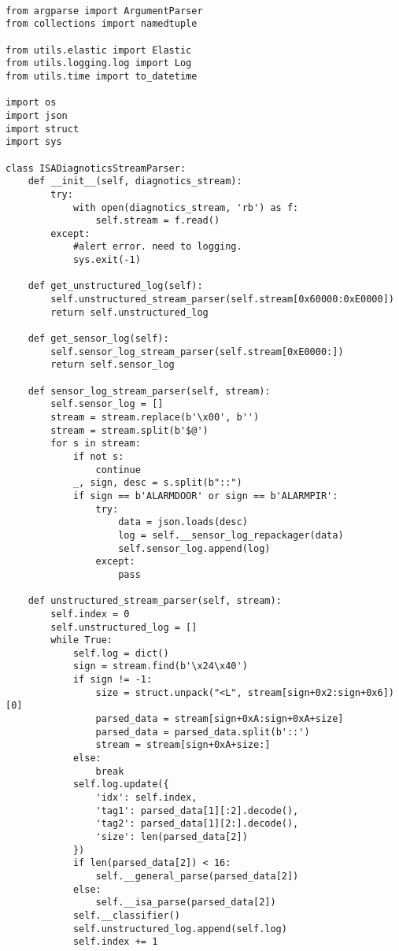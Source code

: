 \documentclass{easychair}
\begin{document}
\lstset{language=Python}
\lstset{frame=lines}
\lstset{basicstyle=\footnotesize}
\begin{lstlisting}

from argparse import ArgumentParser
from collections import namedtuple

from utils.elastic import Elastic
from utils.logging.log import Log
from utils.time import to_datetime

import os
import json
import struct
import sys

class ISADiagnoticsStreamParser:
    def __init__(self, diagnotics_stream):
        try:
            with open(diagnotics_stream, 'rb') as f:
                self.stream = f.read()
        except:
            #alert error. need to logging.
            sys.exit(-1)

    def get_unstructured_log(self):
        self.unstructured_stream_parser(self.stream[0x60000:0xE0000])
        return self.unstructured_log

    def get_sensor_log(self):
        self.sensor_log_stream_parser(self.stream[0xE0000:])
        return self.sensor_log

    def sensor_log_stream_parser(self, stream):
        self.sensor_log = []
        stream = stream.replace(b'\x00', b'')
        stream = stream.split(b'$@')
        for s in stream:
            if not s:
                continue
            _, sign, desc = s.split(b"::")
            if sign == b'ALARMDOOR' or sign == b'ALARMPIR':
                try:
                    data = json.loads(desc)
                    log = self.__sensor_log_repackager(data)
                    self.sensor_log.append(log)
                except:
                    pass

    def unstructured_stream_parser(self, stream):
        self.index = 0
        self.unstructured_log = []
        while True:
            self.log = dict()
            sign = stream.find(b'\x24\x40')
            if sign != -1:
                size = struct.unpack("<L", stream[sign+0x2:sign+0x6])[0]
                parsed_data = stream[sign+0xA:sign+0xA+size]
                parsed_data = parsed_data.split(b'::')
                stream = stream[sign+0xA+size:]
            else:
                break
            self.log.update({
                'idx': self.index,
                'tag1': parsed_data[1][:2].decode(),
                'tag2': parsed_data[1][2:].decode(),
                'size': len(parsed_data[2])
            })
            if len(parsed_data[2]) < 16:
                self.__general_parse(parsed_data[2])
            else:
                self.__isa_parse(parsed_data[2])
            self.__classifier()
            self.unstructured_log.append(self.log)
            self.index += 1


\end{lstlisting}
\end{document}

